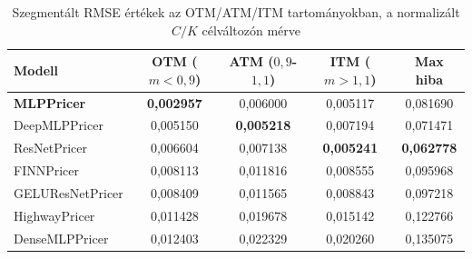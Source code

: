 \begin{table}[H]
\centering
\caption{Összesített kiértékelési eredmények a normalizált $C/K$ célváltozón mérve (teszthalmaz, $N = 150\,000$)}
\label{tab:results}
\renewcommand{\arraystretch}{1.15}
\end{table}

\begin{table}[H]
\centering
\caption{Szegmentált RMSE értékek az OTM/ATM/ITM tartományokban, a normalizált $C/K$ célváltozón mérve}
\label{tab:segmented}
\small
\renewcommand{\arraystretch}{1.15}
\begin{tabular}{lcccc}
\toprule
Modell & OTM ($m<0{,}9$) & ATM ($0{,}9$-$1{,}1$) & ITM ($m>1{,}1$) & Max hiba \\
\midrule
\textbf{MLPPricer}  & \textbf{0{,}002957} & 0{,}006000          & 0{,}005117          & 0{,}081690 \\
DeepMLPPricer        & 0{,}005150          & \textbf{0{,}005218} & 0{,}007194          & 0{,}071471 \\
ResNetPricer         & 0{,}006604          & 0{,}007138          & \textbf{0{,}005241} & \textbf{0{,}062778} \\
FINNPricer           & 0{,}008113          & 0{,}011816          & 0{,}008555          & 0{,}095968 \\
GELUResNetPricer     & 0{,}008409          & 0{,}011565          & 0{,}008843          & 0{,}097218 \\
HighwayPricer        & 0{,}011428          & 0{,}019678          & 0{,}015142          & 0{,}122766 \\
DenseMLPPricer       & 0{,}012403          & 0{,}022329          & 0{,}020260          & 0{,}135075 \\
\bottomrule
\end{tabular}
\end{table}

